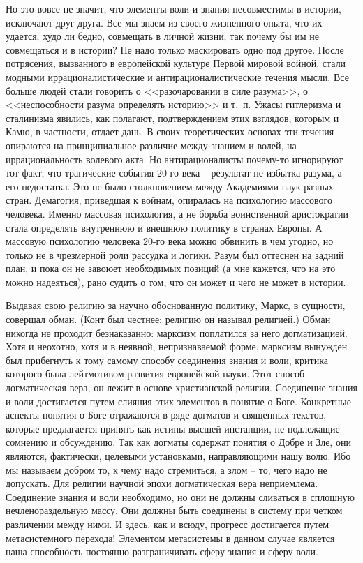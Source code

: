 \documentclass{book}
\begin{document}
Но это вовсе не значит, что элементы воли и знания несовместимы в истории, исключают друг друга. Все мы знаем из своего жизненного опыта, что их удается, худо ли бедно, сов­мещать в личной жизни, так почему бы им не совмещаться и в истории? Не надо только маскировать одно под другое. После потрясения, вызванного в европейской культуре Первой мировой войной, стали модными иррационалистические и антирационалистические течения мысли. Все больше людей стали говорить о <<разочаровании в силе разума>>, о <<неспособности разума определять историю>> и т.~п. Ужасы гитлеризма и сталинизма явились, как полагают, подтверждением этих взглядов, которым и Камю, в частности, отдает дань. В своих теоретических основах эти течения опираются на принципиальное различие между знанием и волей, на иррациональность волевого акта. Но антирационалисты почему-то игнорируют тот факт, что тра­гические события 20-го века -- результат не избытка разума, а его недостатка. Это не было столкновением между Академиями наук разных стран. Демагогия, 
приведшая к войнам, опиралась на психологию массового человека.  Именно массовая психология, а не борьба воинственной аристократии стала определять внутреннюю и внешнюю политику в странах Европы. А массовую психологию человека 20-го века можно обвинить в чем угодно, но только не в чрезмерной роли рассудка и логики. Разум был оттеснен на задний план, и пока он не завоюет необходимых позиций (а мне кажется, что на это можно надеяться), рано судить о том, что он может и чего не может в истории.

Выдавая свою религию за научно обоснованную политику, Маркс, в сущности, совершал обман. (Конт был честнее: религию он называл религией.) Обман никогда не проходит безнаказанно: марксизм поплатился за него догматизацией. Хотя и неохотно, хотя и в неявной, непризнаваемой форме, марксизм вынужден был прибегнуть к тому самому способу соединения знания и воли, критика которого была лейтмотивом развития европейской науки. Этот способ -- догматическая вера, он лежит в основе христианской религии. Соединение знания и воли достигается путем слияния этих элементов в понятие о Боге. Конкретные аспекты понятия о Боге отражаются в ряде догматов и священных текстов, которые предлагается принять как истины высшей инстанции, не подлежащие сомнению и обсуждению. Так как догматы содержат понятия о Добре и Зле, они являются, фактически, целевыми установками, направляющими нашу волю. Ибо мы называем добром то, к чему надо стре­миться, а злом -- то, чего надо не допускать.
Для религии научной эпохи догматическая вера неприемлема. Соединение знания и воли необходимо, но они не должны сливаться в сплошную нечленораздельную массу. Они должны быть соединены в систему при четком различении между ними. И здесь, как и всюду, прогресс достигается путем метасистемного перехода! Элементом метасистемы в данном случае является наша способность постоянно разграничивать сферу знания и сферу воли.
\end{document}
